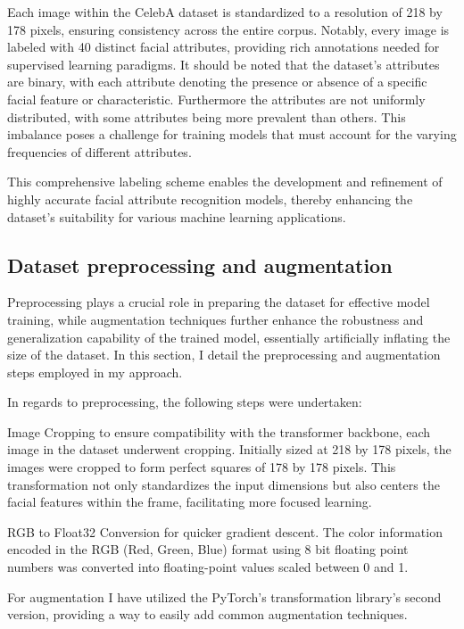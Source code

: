 \documentclass[a4paper,oneside]{article}
\begin{document}
Each image within the CelebA dataset is standardized to a resolution of 218 by 178 pixels, ensuring consistency across the entire corpus.
Notably, every image is labeled with 40 distinct facial attributes, providing rich annotations needed for supervised learning paradigms.
It should be noted that the dataset's attributes are binary, with each attribute denoting the presence or absence of a specific facial feature or characteristic.
Furthermore the attributes are not uniformly distributed, with some attributes being more prevalent than others.
This imbalance poses a challenge for training models that must account for the varying frequencies of different attributes.

This comprehensive labeling scheme enables the development and refinement of highly accurate facial attribute recognition models, thereby enhancing the dataset's suitability for various machine learning applications.

\subsection{Dataset preprocessing and augmentation}
\label{sec:subsection_dataset_preprocessing}

Preprocessing plays a crucial role in preparing the dataset for effective model training, while augmentation techniques further enhance the robustness and generalization capability of the trained model, essentially artificially inflating the size of the dataset. In this section, I detail the preprocessing and augmentation steps employed in my approach.

In regards to preprocessing, the following steps were undertaken:

Image Cropping to ensure compatibility with the transformer backbone, each image in the dataset underwent cropping.
Initially sized at 218 by 178 pixels, the images were cropped to form perfect squares of 178 by 178 pixels.
This transformation not only standardizes the input dimensions but also centers the facial features within the frame, facilitating more focused learning.

RGB to Float32 Conversion for quicker gradient descent. The color information encoded in the RGB (Red, Green, Blue) format using 8 bit floating point numbers was converted into floating-point values scaled between 0 and 1.

For augmentation I have utilized the PyTorch's transformation library's second version, providing a way to easily add common augmentation techniques.
\end{document}
